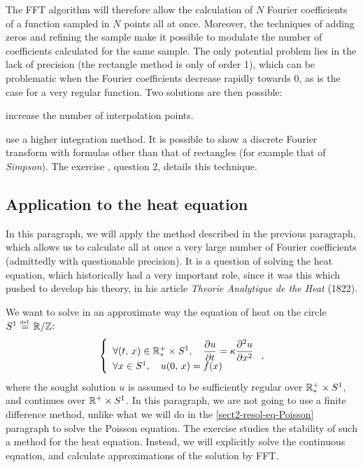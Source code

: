  
The FFT algorithm will therefore allow the calculation of $ N $ Fourier coefficients of a function sampled in $ N $ points all at once. Moreover, the techniques of adding zeros and refining the sample make it possible to modulate the number of coefficients calculated for the same sample. The only potential problem lies in the lack of precision (the rectangle method is only of order 1), which can be problematic when the Fourier coefficients decrease rapidly towards 0, as is the case for a very regular function. Two solutions are then possible: \begin{rs}
\item increase the number of interpolation points.
\item use a higher integration method. It is possible to show a discrete Fourier transform with formulas other than that of rectangles (for example that of \textit{Simpson}). The exercise , question 2, details this technique.
\end{rs}
\subsection{Application to the heat equation}
\label{sect2-resol-eq-heat} 
 
 
 In this paragraph, we will apply the method described in the previous paragraph, which allows us to calculate all at once a very large number of Fourier coefficients (admittedly with questionable precision). It is a question of solving the heat equation, which historically had a very important role, since it was this which pushed  to develop his theory, in his article \textit{Theorie Analytique de the Heat} (1822).
 
 
 We want to solve in an approximate way the equation of heat on the circle $ S^1 \stackrel{\mbox{\upshape\tiny def.}}{=} \mathbb{R} / \mathbb{Z} $:
\begin{equation}
\label{heat-eq}
\left\{\begin{array}{l} \forall (t, \, x) \in \mathbb{R}_*^{+} \times S^1, \quad \displaystyle{ \frac{ \partial u}{\partial t}  = \kappa  \frac{ \partial^2 u}{\partial x^2} } \\\forall x \in S^1, \quad u (0, \, x) = f(x) \end{array} \right. ,
\end{equation}
where the sought solution $ u $ is assumed to be sufficiently regular over $ \mathbb{R}_*^{+} \times S^1 $, and continues over $ \mathbb{R}^{+} \times S^1 $. In this paragraph, we are not going to use a finite difference method, unlike what we will do in the \ref{sect2-resol-eq-Poisson} paragraph to solve the Poisson equation. The exercise  studies the stability of such a method for the heat equation. Instead, we will explicitly solve the continuous equation, and calculate approximations of the solution by FFT.
 
